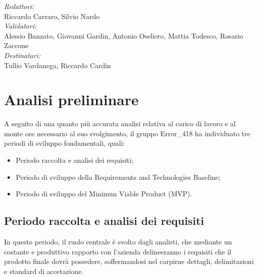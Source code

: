 \documentclass[a4paper, twoside]{article}
\begin{document}
\begin{titlepage}
\vspace{0.5cm} %

\begin{center} %
\emph{\Large Redattori:}\\
\large{Riccardo Carraro, Silvio Nardo}\\
\vspace{1cm} %
\emph{\Large Validatori:}\\
\large{Alessio Banzato, Giovanni Gardin, Antonio Oseliero, Mattia Todesco, Rosario Zaccone}\\
\vspace{1cm} %
\emph{\Large Destinatari:}\\
\large{Tullio Vardanega, Riccardo Cardin}
\end{center}

\vfill %
\end{titlepage}
\newpage

\section{Analisi preliminare}
\large{A seguito di una quanto più accurata analisi relativa al carico di lavoro e al monte ore necessario al suo svolgimento, il gruppo Error\_418 ha individuato tre periodi di sviluppo fondamentali, quali:}
\begin{itemize}
    \item Periodo raccolta e analisi dei requisiti;
    \item Periodo di sviluppo della Requirements and Technologies Baseline;
    \item Periodo di sviluppo del Minimun Viable Product (MVP).
\end{itemize}

\subsection{Periodo raccolta e analisi dei requisiti}
In questo periodo, il ruolo centrale è svolto dagli analisti, che mediante un costante e produttivo rapporto con l'azienda delineeranno i requisiti che il prodotto finale dovrà possedere, soffermandosi nel carpirne dettagli, delimitazioni e standard di accetazione.
\end{document}
